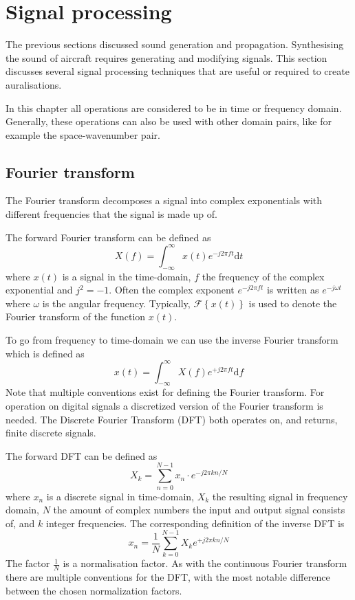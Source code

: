 \section{Signal processing}
The previous sections discussed sound generation and propagation. Synthesising
the sound of aircraft requires generating and modifying signals. This section
discusses several signal processing techniques that are useful or required to
create auralisations.

In this chapter all operations are considered to be in time or frequency
domain. Generally, these operations can also be used with other domain pairs, like for
example the space-wavenumber pair.

\subsection{Fourier transform}
The Fourier transform decomposes a signal into complex exponentials with
different frequencies that the signal is made up of.

The forward Fourier transform can be defined as
\begin{equation}
 X(f) = \int_{-\infty}^{\infty} x(t) e^{-j 2 \pi f t} \mathrm{d} t
\end{equation}
where $x(t)$ is a signal in the time-domain, $f$ the frequency of the complex exponential and $j^2=-1$.
Often the complex exponent $e^{-j 2 \pi f t}$ is written as $e^{-j \omega t}$ where $\omega$ is the angular frequency.
Typically, $\mathcal{F} \left\{ x(t) \right\}$ is used to denote the Fourier transform of the function $x(t)$.

To go from frequency to time-domain we can use the inverse Fourier transform which is defined as
\begin{equation}
 x(t) = \int_{-\infty}^{\infty} X(f) e^{+j 2 \pi f t} \mathrm{d} f
\end{equation}
Note that multiple conventions exist for defining the Fourier transform.
For operation on digital signals a discretized version of the
Fourier transform is needed. The Discrete Fourier Transform (DFT) both operates on, and
returns, finite discrete signals.

The forward DFT can be defined as
\begin{equation}
 X_k = \sum_{n=0}^{N-1} x_n \cdot e^{-j 2\pi k n / N}
\end{equation}
where $x_n$ is a discrete signal in time-domain, $X_k$ the resulting signal in
frequency domain, $N$ the amount of complex numbers the input and output signal
consists of, and $k$ integer frequencies. The corresponding definition of the inverse DFT is
\begin{equation}
 x_n = \frac{1}{N} \sum_{k=0}^{N-1} X_k e^{+j 2 \pi k n/N}
\end{equation}
The factor $\frac{1}{N}$ is a normalisation factor. As with the
continuous Fourier transform there are multiple conventions for the DFT, with
the most notable difference between the chosen normalization factors.

